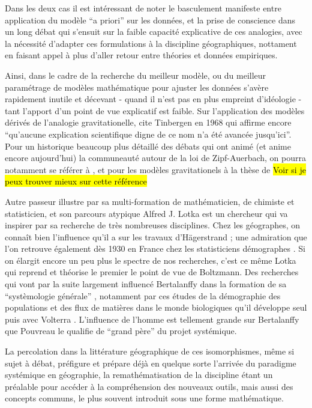 Dans les deux cas il est intéressant de noter le basculement manifeste entre application du modèle \foreignquote{latin}{a priori} sur les données, et la prise de conscience dans un long débat qui s'ensuit sur la faible capacité explicative de ces analogies, avec la nécessité d'adapter ces formulations à la discipline géographiques, nottament en faisant appel à plus d'aller retour entre théories et données empiriques. 

Ainsi, dans le cadre de la recherche du meilleur modèle, ou du meilleur paramétrage de modèles mathématique pour ajuster les données s'avère rapidement inutile et décevant - quand il n'est pas en plus empreint d'idéologie - tant l'apport d'un point de vue explicatif est faible. Sur l'application des modèles dérivés de l'analogie gravitationelle, \textcite[37]{Pumain1982} cite Tinbergen en 1968 qui affirme encore \enquote{qu'aucune explication scientifique digne de ce nom n'a été avancée jusqu'ici}. Pour un historique beaucoup plus détaillé des débats qui ont animé (et anime encore aujourd'hui) la communeauté autour de la loi de Zipf-Auerbach, on pourra notamment se référer à \textcite{Pumain1982}, et pour les modèles gravitationels à la thèse de \autocite{JensenButler1970} \hl{Voir si je peux trouver mieux sur cette référence}

Autre passeur illustre par sa multi-formation de mathématicien, de chimiste et statisticien, et son parcours atypique Alfred J. Lotka est un chercheur qui va inspirer par sa recherche de très nombreuses disciplines. Chez les géographes, on connaît bien l'influence qu'il a sur les travaux d'Hägerstrand \autocite[95]{Claval2007}; une admiration que l'on retrouve également dès 1930 en France chez les statisticiens démographes \autocite{Veron2009}. Si on élargit encore un peu plus le spectre de nos recherches, c'est ce même Lotka qui reprend et théorise le premier le point de vue de Boltzmann. Des recherches qui vont par la suite largement influencé Bertalanffy dans la formation de sa \enquote{systèmologie générale} \autocite[178]{Pouvreau2013}, notamment par ces études de la démographie des populations et des flux de matières dans le monde biologiques qu'il développe seul puis avec Volterra \autocite[545-546]{Pouvreau2013}. L'influence de l'homme est tellement grande sur Bertalanffy que Pouvreau le qualifie de \enquote{grand père} du projet systémique.

La percolation dans la littérature géographique de ces isomorphismes, même si sujet à débat, préfigure et prépare déjà en quelque sorte l'arrivée du paradigme systémique en géographie, la remathématisation de la discipline étant un préalable pour accéder à la compréhension des nouveaux outils, mais aussi des concepts communs, le plus souvent introduit sous une forme mathématique. \autocite[432]{Ackerman1963}


